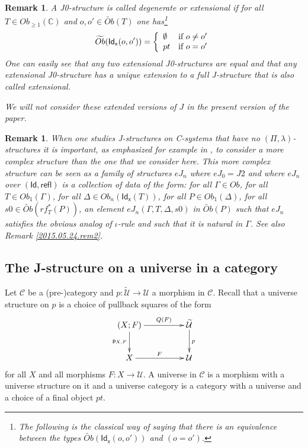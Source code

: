 \documentclass[12pt]{article}
\numberwithin{equation}{section}
\newtheorem{remark}[proposition]{Remark}
\newcommand{\llabel}[1]{\label{#1}}
\newcommand{\sr}{\rightarrow}
\newcommand{\wt}{\widetilde}
\newcommand{\aCC}{{\mathbb C}}  %
\newcommand{\p}{\mathsf{p}}
\newcommand{\Id}{\mathsf{Id}} %
\newcommand{\refl}{\mathsf{refl}}
\newcommand{\Idx}{\mathsf{Id_x}} %
\newcommand{\U}{\mathcal{U}}
\begin{document}
\begin{remark}
\llabel{2015.05.12.rem1}\rm A J0-structure is called degenerate or extensional
if for all $T\in Ob_{\ge 1}(\aCC)$ and $o,o'\in \wt{Ob}(T)$ one has\footnote{The
  following is the classical way of saying that there is an equivalence between
  the types $\wt{Ob}(\Idx(o,o'))$ and $(o=o')$.}
%
$$\wt{Ob}(\Idx(o,o'))=\left\{
\begin{array}{ll}
\emptyset&\mbox{\rm if $o\ne o'$}\\ pt&\mbox{\rm if $o=o'$}
\end{array}
\right.
$$
%
One can easily see that any two extensional J0-structures are equal and that
any extensional J0-structure has a unique extension to a full J-structure that
is also called extensional.

We will not consider these extended versions of $J$ in the present version of
the paper.
\end{remark}


%
\begin{remark}\rm
\llabel{2015.05.24.rem1} When one studies J-structures on C-systems that have
no $(\Pi,\lambda)$-structures it is important, as emphasized for example in
\cite{vandenBergGarner2011}, to consider a more complex structure than the one
that we consider here. This more complex structure can be seen as a family of
structures $eJ_n$ where $eJ_0=J2$ and where $eJ_n$ over $(\Id,\refl)$ is a
collection of data of the form: for all $\Gamma\in Ob$, for all $T\in
Ob_1(\Gamma)$, for all $\Delta\in Ob_{n}(\Idx(T))$, for all $P\in
Ob_1(\Delta)$, for all $s0\in \wt{Ob}(rf_T^*(P))$, an element
$eJ_n(\Gamma,T,\Delta,s0)$ in $\wt{Ob}(P)$ such that $eJ_n$ satisfies the
obvious analog of $\iota$-rule and such that it is natural in $\Gamma$. See
also Remark \ref{2015.05.24.rem2}.
\end{remark}









\subsection{The J-structure on a universe in a category}
%
Let $\mathcal C$ be a (pre-)category and $p:\wt{\U}\sr \U$ a morphism in
$\mathcal C$. Recall that a universe structure on $p$ is a choice of pullback
squares of the form
%
$$
\begin{xy}
          \xymatrix@C=4pc{ (X;F) \ar[r]^-{Q(F)} \ar[d]_{\p_{X,F}} & \wt{\U}
            \ar[d]^{p}\\ X \ar[r]^{F} & \U }
\end{xy}
$$
%
for all $X$ and all morphisms $F:X\sr \U$. A universe in $\mathcal C$ is a
morphism with a universe structure on it and a universe category is a category
with a universe and a choice of a final object $pt$.
\end{document}
